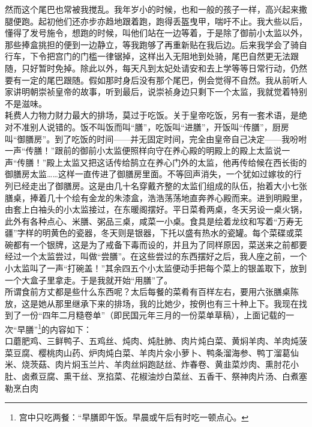 然而这个尾巴也常被我搅乱。我年岁小的时候，也和一般的孩子一样，高兴起来撒腿便跑。起初他们还亦步亦趋地跟着跑，跑得丢盔曳甲，喘吁不止。我大些以后，懂得了发号施令，想跑的时候，叫他们站在一边等着，于是除了御前小太监以外，那些捧盒挑担的便到一边静立，等我跑够了再重新贴在我后边。后来我学会了骑自行车，下令把宫门的门槛一律锯掉，这样出入无阻地到处骑，尾巴自然更无法跟随，只好暂时免掉。除此以外，每天凡到太妃处请安和去上学等等日常行动，仍然要有一定的尾巴跟随。假如那时身后没有那个尾巴，例会觉得不自然。我从前听人家讲明朝崇祯皇帝的故事，听到最后，说崇祯身边只剩下一个太监，我就觉着特别不是滋味。\\

耗费人力物力财力最大的排场，莫过于吃饭。关于皇帝吃饭，另有一套术语，是绝对不准别人说错的。饭不叫饭而叫“膳”，吃饭叫“进膳”，开饭叫“传膳”，厨房叫“御膳房”。到了吃饭的时间——并无固定时间，完全由皇帝自己决定——我吩咐一声“传膳！”跟前的御前小太监便照样向守在养心殿的明殿上的殿上太监说一声“传膳！”殿上太监又把这话传给鹄立在养心门外的太监，他再传给候在西长街的御膳房太监……这样一直传进了御膳房里面。不等回声消失，一个犹如过嫁妆的行列已经走出了御膳房。这是由几十名穿戴齐整的太监们组成的队伍，抬着大小七张膳桌，捧着几十个绘有金龙的朱漆盒，浩浩荡荡地直奔养心殿而来。进到明殿里，由套上白袖头的小太监接过，在东暖阁摆好。平日菜肴两桌，冬天另设一桌火锅，此外有各种点心、米膳、粥品三桌，咸菜一小桌。食具是绘着龙纹和写着“万寿无疆”字样的明黄色的瓷器，冬天则是银器，下托以盛有热水的瓷罐。每个菜碟或菜碗都有一个银牌，这是为了戒备下毒而设的，并且为了同样原因，菜送来之前都要经过一个太监尝过，叫做“尝膳”。在这些尝过的东西摆好之后，我人座之前，一个小太监叫了一声“打碗盖！”其余四五个小太监便动手把每个菜上的银盖取下，放到一个大盒子里拿走。于是我就开始“用膳”了。\\

所谓食前方丈都是些什么东西呢？太后每餐的菜肴有百样左右，要用六张膳桌陈放，这是她从那里继承下来的排场，我的比她少，按例也有三十种上下。我现在找到了一份“四年二月糙卷单”（即民国元年三月的一份菜单草稿），上面记载的一次“早膳”\footnote{宫中只吃两餐：“早膳即午饭。早晨或午后有时吃一顿点心。}的内容如下：\\

口蘑肥鸡、三鲜鸭子、五鸡丝、炖肉、炖肚肺、肉片炖白菜、黄焖羊肉、羊肉炖菠菜豆腐、樱桃肉山药、炉肉炖白菜、羊肉片汆小萝卜、鸭条溜海参、鸭丁溜葛仙米、烧茨菇、肉片焖玉兰片、羊肉丝焖跑跶丝、炸春卷、黄韭菜炒肉、熏肘花小肚、卤煮豆腐、熏干丝、烹掐菜、花椒油炒白菜丝、五香干、祭神肉片汤、白煮塞勒烹白肉\\

